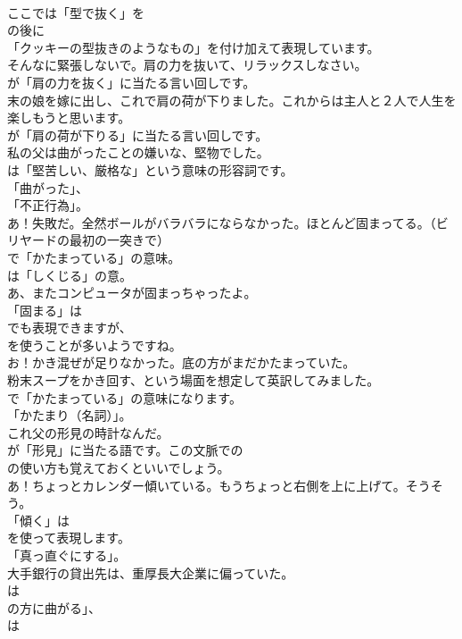\documentclass[8pt]{extreport}
\begin{document}
\begin{CJK}{UTF8}{min}
\\	ここでは「型で抜く」を
\\	の後に
\\	「クッキーの型抜きのようなもの」を付け加えて表現しています。	
\\	そんなに緊張しないで。肩の力を抜いて、リラックスしなさい。 
\\	が「肩の力を抜く」に当たる言い回しです。	
\\	末の娘を嫁に出し、これで肩の荷が下りました。これからは主人と２人で人生を楽しもうと思います。 
\\	が「肩の荷が下りる」に当たる言い回しです。	
\\	私の父は曲がったことの嫌いな、堅物でした。 
\\	は「堅苦しい、厳格な」という意味の形容詞です。
\\	「曲がった」、
\\	「不正行為」。	
\\	あ！失敗だ。全然ボールがバラバラにならなかった。ほとんど固まってる。（ビリヤードの最初の一突きで） 
\\	で「かたまっている」の意味。
\\	は「しくじる」の意。	
\\	あ、またコンピュータが固まっちゃったよ。 
\\	「固まる」は
\\	でも表現できますが、
\\	を使うことが多いようですね。	
\\	お！かき混ぜが足りなかった。底の方がまだかたまっていた。 
\\	粉末スープをかき回す、という場面を想定して英訳してみました。
\\	で「かたまっている」の意味になります。
\\	「かたまり（名詞）」。	
\\	これ父の形見の時計なんだ。 
\\	が「形見」に当たる語です。この文脈での
\\	の使い方も覚えておくといいでしょう。	
\\	あ！ちょっとカレンダー傾いている。もうちょっと右側を上に上げて。そうそう。 
\\	「傾く」は
\\	を使って表現します。
\\	「真っ直ぐにする」。	
\\	大手銀行の貸出先は、重厚長大企業に偏っていた。 
\\	は
\\	の方に曲がる」、
\\	は

\end{CJK}
\end{document}
